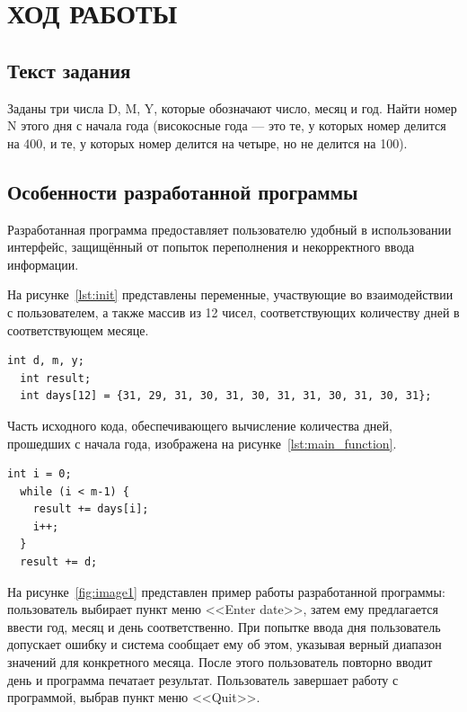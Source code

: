 
\section{ХОД РАБОТЫ}

\subsection{Текст задания}

Заданы три числа D, M, Y, которые обозначают число, месяц и год. Найти номер N этого дня с начала года (високосные года --- это те, у которых номер делится на 400, и те, у которых номер делится на четыре, но не делится на 100).

\subsection{Особенности разработанной программы}

Разработанная программа предоставляет пользователю удобный в использовании интерфейс, защищённый от попыток переполнения и некорректного ввода информации.

На рисунке~\ref{lst:init} представлены переменные, участвующие во взаимодействии с пользователем, а также массив из 12 чисел, соответствующих количеству дней в соответствующем месяце.

\begin{lstlisting}[caption=Объявление переменных и инициализация массива,label=lst:init]
  int d, m, y;
  int result;
  int days[12] = {31, 29, 31, 30, 31, 30, 31, 31, 30, 31, 30, 31};  
\end{lstlisting}

Часть исходного кода, обеспечивающего вычисление количества дней, прошедших с начала года, изображена на рисунке~\ref{lst:main_function}.

\begin{lstlisting}[caption=Вычисление количества дней,label=lst:main_function]
  int i = 0;
  while (i < m-1) {
    result += days[i];
    i++;
  }
  result += d;
\end{lstlisting}

На рисунке~\ref{fig:image1} представлен пример работы разработанной программы: пользователь выбирает пункт меню <<Enter date>>, затем ему предлагается ввести год, месяц и день соответственно. При попытке ввода дня пользователь допускает ошибку и система сообщает ему об этом, указывая верный диапазон значений для конкретного месяца. После этого пользователь повторно вводит день и программа печатает результат. Пользователь завершает работу с программой, выбрав пункт меню <<Quit>>.

